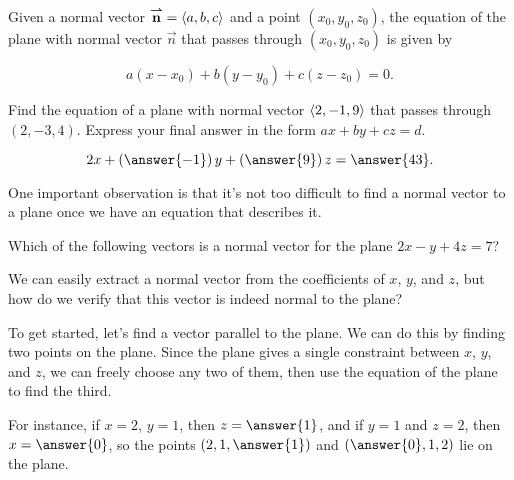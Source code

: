 \documentclass{ximera}
\author{Jim Talamo}
\begin{document}
\begin{exercise}

Given a normal vector ${\overset{\boldsymbol{\rightharpoonup}}{\mathbf{n}}} = \left\langle a,b,c\right\rangle$ and a point $(x_0,y_0,z_0)$, the equation of the plane with normal vector $\vec{n}$ that passes through $(x_0,y_0,z_0)$ is given by 

\[
a(x-x_0)+b(y-y_0)+c(z-z_0) = 0.
\]

Find the equation of a plane with normal vector $\left\langle 2,-1,9\right\rangle$ that passes through $(2,-3,4)$.  Express your final answer in the form $ax+by+cz=d$.  

\[
2x+\left(\answer{-1}\right)y+\left(\answer{9}\right)z = \answer{43}.
\]

\begin{exercise}
One important observation is that it's not too difficult to find a normal vector to a plane once we have an equation that describes it.

Which of the following vectors is a normal vector for the plane $2x-y+4z=7$?

\begin{multipleChoice}
\end{multipleChoice}

\begin{exercise}
We can easily extract a normal vector from the coefficients of $x$, $y$, and $z$, but how do we verify that this vector is indeed normal to the plane?

\begin{multipleChoice}
\end{multipleChoice}

To get started, let's find a vector parallel to the plane.  We can do this by finding two points on the plane.  Since the plane gives a single constraint between $x$, $y$, and $z$, we can freely choose any two of them, then use the equation of the plane to find the third.

For instance, if $x=2$, $y=1$, then $z= \answer{1}$, and if $y=1$ and $z=2$, then $x=\answer{0}$, so the points $\left(2,1,\answer{1}\right)$ and $\left(\answer{0}, 1, 2\right)$ lie on the plane.


\end{exercise}
\end{exercise}
\end{exercise}
\end{document}

